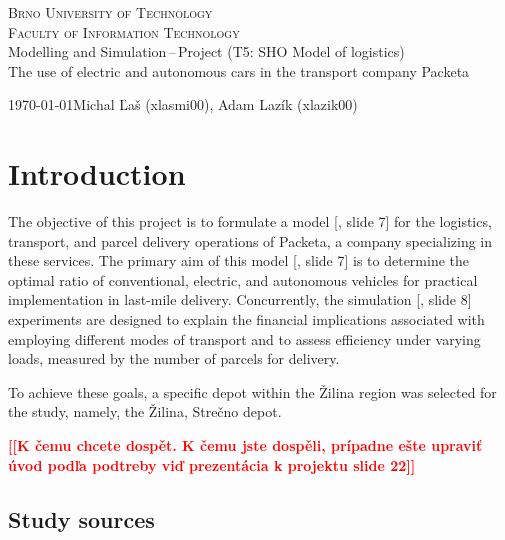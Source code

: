 \documentclass[a4paper, 11pt, a4paper]{article}
\newcommand{\todo}[1]{\textcolor{red}{\textbf{[[#1]]}}}
\begin{document}
\begin{titlepage}
    \begin{center}
            \textsc{\Huge Brno University of Technology \\}
            \vspace{0.5em}
            \textsc{\huge Faculty of Information Technology \\}
            {\LARGE 	Modelling and Simulation\,--\,Project (T5: SHO Model of logistics) \\
            \vspace{0.4em}
            \Huge The use of electric and autonomous cars in the transport company Packeta}
    \end{center}
    {\Large \today \hfill Michal Ľaš (xlasmi00), Adam Lazík (xlazik00)}
\end{titlepage}

\tableofcontents
\newpage

\section{Introduction}

The objective of this project is to formulate a model [\cite{IMS.lectures}, slide 7] for the logistics, transport, and parcel delivery operations of Packeta, 
a company specializing in these services. The primary aim of this model [\cite{IMS.lectures}, slide 7] is to determine the optimal ratio of conventional, electric, 
and autonomous vehicles for practical implementation in last-mile delivery. Concurrently, the simulation [\cite{IMS.lectures}, slide 8] experiments are designed to 
explain the financial implications associated with employing different modes of transport and to assess efficiency under varying loads, 
measured by the number of parcels for delivery.

To achieve these goals, a specific depot within the Žilina region was selected for the study, namely, the Žilina, Strečno depot.

\noindent\todo{K čemu chcete dospět. K čemu jste dospěli, prípadne ešte upraviť úvod podľa podtreby viď prezentácia k projektu slide 22}


\subsection{Study sources}
\end{document}
